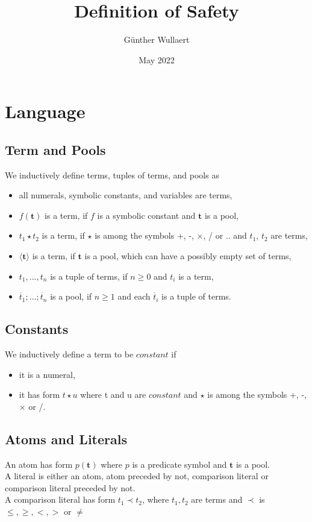 \documentclass{article}
\title{Definition of Safety}
\author{Günther Wullaert}
\date{May 2022}
\newcommand{\pool}[1]{\boldsymbol{#1}}
\newcommand{\tuple}[1]{\dot{#1}}
\begin{document}
	\maketitle
	
	\section{Language}
	\subsection{Term and Pools}
	
	We inductively define terms, tuples of terms, and pools as
	\begin{itemize}
		\item all numerals, symbolic constants, and variables are terms,
		\item $f(\pool{t})$ is a term, if $f$ is a symbolic constant and $\pool{t}$ is a pool,
		\item $t_1 \star t_2$ is a term, if $\star$ is among the symbols +, -, $\times$, / or .. and $t_1$, $t_2$ are terms,
		\item $\langle \pool{t} \rangle$ is a term, if $\pool{t}$ is a pool, which can have a possibly empty set of terms,
		\item $t_1,...,t_n$ is a tuple of terms, if $n \ge 0$ and $t_i$ is a term,
  		\item $\tuple{t_1};...;\tuple{t_n}$ is a pool, if $n \ge 1$ and each $\tuple{t_i}$ is a tuple of terms.
	\end{itemize}

	\subsection{Constants}

	We inductively define a term to be $\mathit{constant}$ if
	\begin{itemize}
		\item it is a numeral,
		\item it has form $t \star u$ where t and u are $\mathit{constant}$ and $\star$ is among the symbols +, -, $\times$ or /.
	\end{itemize}

	\subsection{Atoms and Literals}
	
	An atom has form $p(\pool{t})$ where $p$ is a predicate symbol and $\pool{t}$ is a pool. 
	\\
	A literal is either an atom, atom preceded by not, comparison literal or comparison literal preceded by not.
	\\
	A comparison literal has form $t_1 \prec t_2$, where $t_1,t_2$ are terms and $\prec$ is $\leq,\ge,<,>$ or $\neq$
\end{document}
